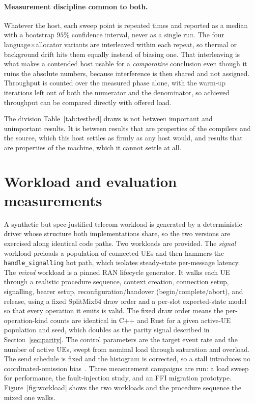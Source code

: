 \documentclass[english,oneside,a4paper,censored,csm,software-track-2020]{HYthesisML}
\begin{document}
\paragraph{Measurement discipline common to both.}
Whatever the host, each sweep point is repeated \NRepeats{} times and reported as a
median with a bootstrap $95\%$ confidence interval, never as a single run. The four
language$\times$allocator variants are interleaved within each repeat, so thermal or
background drift hits them equally instead of biasing one. That interleaving is what makes
a contended host usable for a \emph{comparative} conclusion even though it ruins the
absolute numbers, because interference is then shared and not assigned. Throughput is counted
over the measured phase alone, with the warm-up iterations left out of both the numerator and the
denominator, so achieved throughput can be compared directly with offered load.

The division Table~\ref{tab:testbed} draws is not between important and unimportant results. It
is between results that are properties of the compilers and the source, which this host settles
as firmly as any host would, and results that are properties of the machine, which it cannot
settle at all.

\section{Workload and evaluation measurements\label{sec:workload}}
A synthetic but spec-justified telecom workload is generated by a deterministic driver whose
structure both implementations share, so the two versions are exercised along identical
code paths. Two workloads are provided. The \emph{signal} workload preloads a population of
connected UEs and then hammers the \texttt{handle\_signalling} hot path, which isolates
steady-state per-message latency. The \emph{mixed} workload is a pinned RAN lifecycle generator.
It walks each UE through a realistic procedure sequence, context creation, connection setup,
signalling, bearer setup, reconfiguration/handover (begin/complete/abort), and release, using a
fixed SplitMix64 draw order and a per-slot expected-state model so that every operation it emits
is valid. The fixed draw order means the per-operation-kind counts are identical in C++ and
Rust for a given active-UE population and seed, which doubles as the parity signal described in
Section~\ref{sec:parity}. The control parameters are the target event rate and the number of
active UEs, swept from nominal load through saturation and overload. The send schedule is fixed
and the histogram is corrected, so a stall introduces no coordinated-omission
bias~\cite{schroeder2006openclosed,tene_hdrhistogram}. Three measurement campaigns are run: a load sweep for
performance, the fault-injection study, and an FFI migration prototype.
Figure~\ref{fig:workload} shows the two workloads and the procedure sequence the mixed one
walks.
\end{document}

